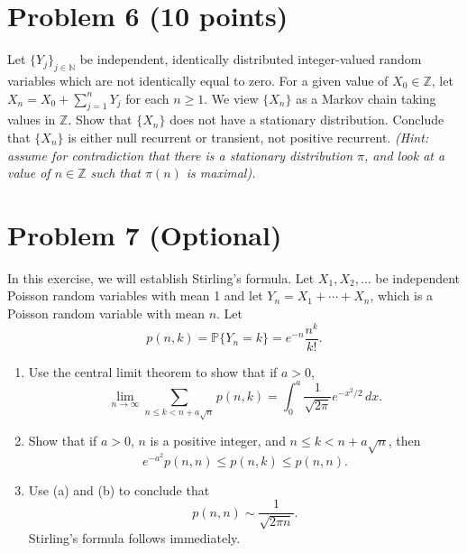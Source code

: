 \documentclass[11pt]{article}
\newcommand{\bbN}{\mathbb{N}}
\begin{document}
\section*{Problem 6 (10 points)}
Let $\{Y_j\}_{j\in\bbN}$ be independent, identically distributed integer-valued random variables which are not identically equal to zero. For a given value of \(X_{0}\in\mathbb{Z}\), let \(X_{n}=X_{0}+\sum_{j=1}^{n}Y_{j}\) for each \(n\geq 1\). We view \(\{X_{n}\}\) as a Markov chain taking values in \(\mathbb{Z}\). Show that \(\{X_{n}\}\) does not have a stationary distribution. Conclude that \(\{X_{n}\}\) is either null recurrent or transient, not positive recurrent. \textit{(Hint: assume for contradiction that there is a stationary distribution \(\pi\), and look at a value of \(n\in\mathbb{Z}\) such that \(\pi(n)\) is maximal).}

\section*{Problem 7 (Optional)}
In this exercise, we will establish Stirling's formula. Let \(X_{1},X_{2},\ldots\) be independent Poisson random variables with mean 1 and let \(Y_{n}=X_{1}+\cdots+X_{n}\), which is a Poisson random variable with mean \(n\). Let
\[
p(n,k)=\mathbb{P}\{Y_{n}=k\}=e^{-n}\frac{n^{k}}{k!}.
\]

\begin{enumerate}[label=(\alph*)]
    \item Use the central limit theorem to show that if \(a>0\),
    \[
    \lim_{n\to\infty}\sum_{n\leq k<n+a\sqrt{n}}p(n,k)=\int_{0}^{a}\frac{1}{\sqrt{2\pi}}e^{-x^{2}/2}\,dx.
    \]
    
    \item Show that if \(a>0\), \(n\) is a positive integer, and \(n\leq k<n+a\sqrt{n}\), then
    \[
    e^{-a^{2}}p(n,n)\leq p(n,k)\leq p(n,n).
    \]
    
    \item Use (a) and (b) to conclude that
    \[
    p(n,n)\sim\frac{1}{\sqrt{2\pi n}}.
    \]
    Stirling's formula follows immediately.
\end{enumerate}
\end{document}
